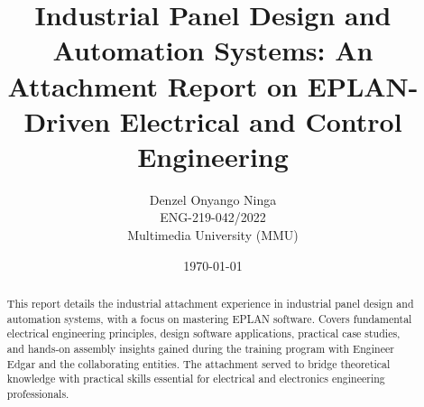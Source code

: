 \documentclass{report}
\title{Industrial Panel Design and Automation Systems: An Attachment Report on EPLAN-Driven Electrical and Control Engineering}
\author{Denzel Onyango Ninga \\ ENG-219-042/2022 \\ Multimedia University (MMU)}
\date{\today}
\begin{document}
\maketitle %

\begin{abstract}
    This report details the industrial attachment experience in industrial panel design and automation systems, with a focus on mastering EPLAN software. Covers fundamental electrical engineering principles, design software applications, practical case studies, and hands-on assembly insights gained during the training program with Engineer Edgar and the collaborating entities. The attachment served to bridge theoretical knowledge with practical skills essential for electrical and electronics engineering professionals.
\end{abstract}

\clearpage %
\tableofcontents %
\clearpage %
\listoffigures %
\clearpage %
\listoftables %









\clearpage

% 
% 
\end{document}
